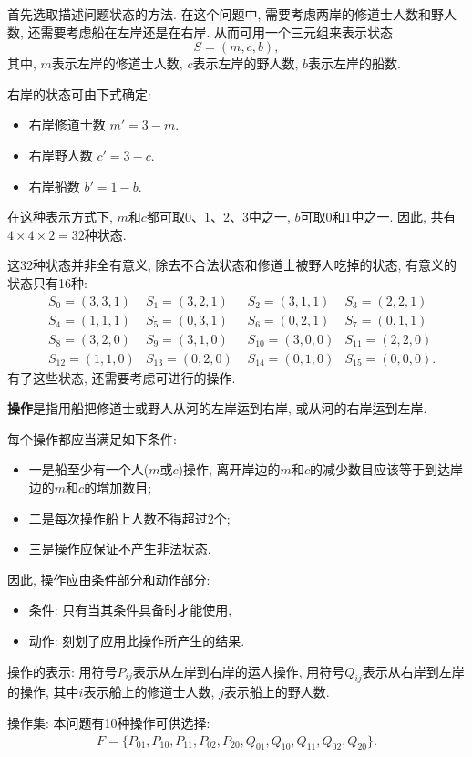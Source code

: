 \begin{result}
首先选取描述问题状态的方法. 在这个问题中, 需要考虑两岸的修道士人数和野人数, 还需要考虑船在左岸还是在右岸. 从而可用一个三元组来表示状态
         $$S=(m, c, b),$$
其中, $m$表示左岸的修道士人数, $c$表示左岸的野人数, $b$表示左岸的船数.

右岸的状态可由下式确定:
\begin{itemize}
\item 右岸修道士数  $m'=3-m$.
\item 右岸野人数   $ c'=3-c$.
\item 右岸船数      $b'=1-b$.
\end{itemize}
在这种表示方式下, $m$和$c$都可取0、1、2、3中之一, $b$可取0和1中之一. 因此, 共有$4\times 4\times 2=32$种状态.

这32种状态并非全有意义, 除去不合法状态和修道士被野人吃掉的状态, 有意义的状态只有16种:
\begin{align*}
        &S_0=(3, 3, 1)  &S_1=(3, 2, 1)     &\,\,S_2=(3, 1, 1)&S_3=(2, 2, 1)\\
        &S_4=(1, 1, 1)  &S_5=(0, 3, 1)     &\,\,S_6=(0, 2, 1)&S_7=(0, 1, 1)\\
        &S_8=(3, 2, 0)  &S_9=(3, 1, 0)     &\,\,S_{10}=(3, 0, 0)&S_{11}=(2, 2, 0)\\
        &S_{12}=(1, 1,0)&S_{13}=(0, 2, 0)  &\,\,S_{14}=(0, 1, 0)&S_{15}=(0, 0, 0).
\end{align*}
有了这些状态, 还需要考虑可进行的操作.

\textbf{操作}是指用船把修道士或野人从河的左岸运到右岸, 或从河的右岸运到左岸.

每个操作都应当满足如下条件:
\begin{itemize}
\item 一是船至少有一个人($m$或$c$)操作, 离开岸边的$m$和$c$的减少数目应该等于到达岸边的$m$和$c$的增加数目;
\item 二是每次操作船上人数不得超过2个;
\item 三是操作应保证不产生非法状态.
\end{itemize}
因此, 操作应由条件部分和动作部分:
\begin{itemize}
\item 条件: 只有当其条件具备时才能使用,
\item 动作: 刻划了应用此操作所产生的结果.
\end{itemize}
操作的表示: 用符号$P_{ij}$表示从左岸到右岸的运人操作, 用符号$Q_{ij}$表示从右岸到左岸的操作, 其中$i$表示船上的修道士人数, $j$表示船上的野人数.

操作集: 本问题有10种操作可供选择:
\begin{align}
  F=\{P_{01}, P_{10}, P_{11}, P_{02}, P_{20},Q_{01}, Q_{10}, Q_{11}, Q_{02}, Q_{20}\}.
\end{align}


\end{result}

